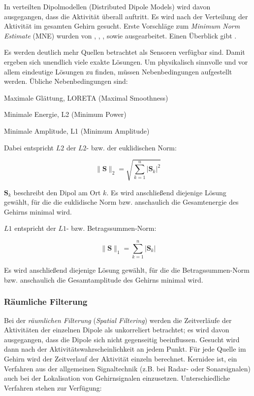 \documentclass[doc,a4paper,12pt]{apa6}
\newcommand{\mx}[1]{\mathbf{#1}}
\begin{document}
In verteilten Dipolmodellen (Distributed Dipole Models) wird davon ausgegangen, dass die Aktivität überall auftritt. Es wird nach der Verteilung der Aktivität im gesamten Gehirn gesucht. Erste Vorschläge zum \emph{Minimum Norm Estimate} (MNE) wurden von \textcite{hamalainen1984interpreting}, \textcite{ilmoniemi1985forward}, \textcite{sarvas1987basic}, sowie \textcite{hamalainen1994interpreting} ausgearbeitet. Einen Überblick gibt \textcite{hamalainen1993magnetoencephalography}.

Es werden deutlich mehr Quellen betrachtet als Sensoren verfügbar sind. Damit ergeben sich unendlich viele exakte Lösungen. Um physikalisch sinnvolle und vor allem eindeutige Lösungen zu finden, müssen Nebenbedingungen aufgestellt werden. Übliche Nebenbedingungen sind:

\begin{compactitem}
\item Maximale Glättung, LORETA (Maximal Smoothness)
\item Minimale Energie, L2 (Minimum Power)
\item Minimale Amplitude, L1 (Minimum Amplitude)
\end{compactitem}

Dabei entspricht $L2$ der $L2$- bzw. der euklidischen Norm:

\begin{equation}
\|\mx{S}\|_2 = \sqrt{\sum_{k=1}^n |\mx{S}_k|^2}
\end{equation}

$\mx{S}_k$ beschreibt den Dipol am Ort $k$. Es wird anschließend diejenige Lösung gewählt, für die die euklidische Norm bzw. anschaulich die Gesamtenergie des Gehirns minimal wird.

$L1$ entspricht der $L1$- bzw. Betragssummen-Norm:

\begin{equation}
\|\mx{S}\|_1 = \sum_{k=1}^n |\mx{S}_k|
\end{equation}

Es wird anschließend diejenige Lösung gewählt, für die die Betragssummen-Norm bzw. anschaulich die Gesamtamplitude des Gehirns minimal wird.

\subsubsection{Räumliche Filterung}
\label{sec:beam}

Bei der \emph{räumlichen Filterung} (\emph{Spatial Filtering}) werden die Zeitverläufe der Aktivitäten der einzelnen Dipole als unkorreliert betrachtet; es wird davon ausgegangen, dass die Dipole sich nicht gegenseitig beeinflussen. Gesucht wird dann nach der Aktivitätswahrscheinlichkeit an jedem Punkt. Für jede Quelle im Gehirn wird der Zeitverlauf der Aktivität einzeln berechnet. Kernidee ist, ein Verfahren aus der allgemeinen Signaltechnik (z.B. bei Radar- oder Sonarsignalen) auch bei der Lokalisation von Gehirnsignalen einzusetzen. Unterschiedliche Verfahren stehen zur Verfügung:
\end{document}
